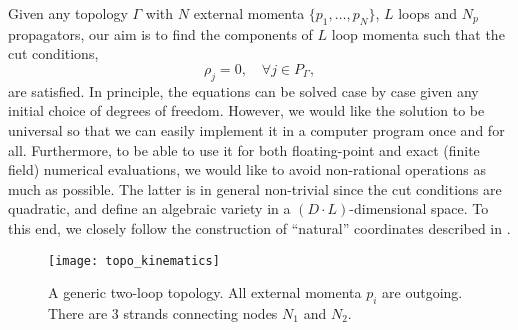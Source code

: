 Given any topology $\Gamma$ with $N$ external momenta $\{p_1,\ldots{},p_N\}$, $L$ loops and $N_p$ propagators, our aim
is to find the components of $L$ loop momenta such that  
the cut conditions,
\[
  \rho_j = 0, \quad \forall j\in P_\Gamma,
\]
are satisfied. 
In principle, the equations can be solved case by case given any initial choice of degrees of freedom.
However, we would like the solution to be universal so that we can easily
implement it in a computer program once and for all. 
Furthermore, to be able to use it for both floating-point and exact (finite field) numerical evaluations, 
we would like to avoid non-rational operations as much as possible.
The latter is in general non-trivial since the cut conditions are quadratic, and
define an algebraic variety in a $(D\cdot L)$-dimensional space.
To this end, we closely follow the construction of ``natural'' coordinates described in \cite{Ita:2015tya, Abreu:2017xsl, Abreu:2017hqn}.

\begin{figure}[ht]
  \centering
  \texttt{[image: topo\_kinematics]}
  \caption{A generic two-loop topology. All external momenta $p_i$ are outgoing. There are 3 strands connecting nodes $N_1$ and $N_2$.}
  \label{fig:topo_kinematics}
\end{figure}

